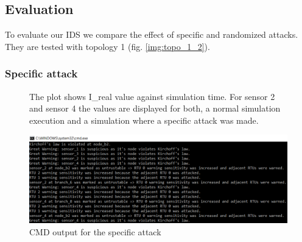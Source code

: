 \documentclass[conference]{IEEEtran}
\begin{document}
	\subsection{Evaluation}
	
		To evaluate our IDS we compare the effect of specific and randomized attacks. They are tested with topology 1 (fig. \ref{img:topo_1_2}).
		
		\subsubsection{Specific attack}
		
			\begin{figure}[!htp]
				\centering
				\caption{The plot shows I\_real value against simulation time. For sensor 2 and sensor 4 the values are displayed for both, a normal simulation execution and a simulation where a specific attack was made.}
				\label{plot:atk_spec}
			\end{figure}
		
			\begin{figure}[!htp]
				\centering
				\includegraphics[width=\textwidth]{stats/topo1/spec/topology1_attacked.png}
				\caption{CMD output for the specific attack}
				\label{img:cmd_spec}
			\end{figure}
		
\end{document}
